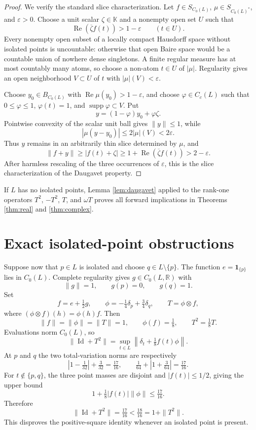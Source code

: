 \documentclass[11pt]{article}
\theoremstyle{remark}
\newcommand{\K}{\mathbb K}
\newcommand{\Id}{\operatorname{Id}}
\begin{document}
\begin{proof}
We verify the standard slice characterization.  Let $f\in S_{C_0(L)}$,
$\mu\in S_{C_0(L)^*}$, and $\varepsilon>0$.  Choose a unit scalar
$\zeta\in\K$ and a nonempty open set $U$ such that
\[
 \operatorname{Re}(\overline\zeta f(t))>1-\varepsilon
 \qquad(t\in U).
\]
Every nonempty open subset of a locally compact Hausdorff space without
isolated points is uncountable: otherwise that open Baire space would be a
countable union of nowhere dense singletons.  A finite regular measure has at
most countably many atoms, so choose a non-atom $t\in U$ of $|\mu|$.
Regularity gives an open neighborhood $V\subset U$ of $t$ with
$|\mu|(V)<\varepsilon$.

Choose $y_0\in B_{C_0(L)}$ with
$\operatorname{Re}\mu(y_0)>1-\varepsilon$, and choose
$\varphi\in C_c(L)$ such that $0\le\varphi\le1$, $\varphi(t)=1$, and
$\operatorname{supp}\varphi\subset V$.  Put
\[
 y=(1-\varphi)y_0+\varphi\zeta.
\]
Pointwise convexity of the scalar unit ball gives $\|y\|\le1$, while
\[
 |\mu(y-y_0)|\le2|\mu|(V)<2\varepsilon.
\]
Thus $y$ remains in an arbitrarily thin slice determined by $\mu$, and
\[
 \|f+y\|\ge |f(t)+\zeta|
 \ge 1+\operatorname{Re}(\overline\zeta f(t))>2-\varepsilon.
\]
After harmless rescaling of the three occurrences of $\varepsilon$, this is
the slice characterization of the Daugavet property.
\end{proof}

If $L$ has no isolated points, Lemma \ref{lem:daugavet} applied to the
rank-one operators $T^2$, $-T^2$, $T$, and $\omega T$ proves all forward
implications in Theorems \ref{thm:real} and \ref{thm:complex}.

\section{Exact isolated-point obstructions}

Suppose now that $p\in L$ is isolated and choose $q\in L\setminus\{p\}$.
The function $e=\mathbf 1_{\{p\}}$ lies in $C_0(L)$.  Complete regularity
gives $g\in C_0(L,\mathbb R)$ with
\[
 \|g\|=1,\qquad g(p)=0,\qquad g(q)=1.
\]
Set
\begin{equation}\label{eq:witness}
 f=e+\tfrac12g,\qquad
 \phi=-\tfrac14\delta_p+\tfrac34\delta_q,\qquad
 T=\phi\otimes f,
\end{equation}
where $(\phi\otimes f)(h)=\phi(h)f$.  Then
\[
 \|f\|=\|\phi\|=\|T\|=1,
 \qquad \phi(f)=\tfrac18,
 \qquad T^2=\tfrac18T.
\]
Evaluations norm $C_0(L)$, so
\[
 \|\Id+T^2\|
 =\sup_{t\in L}
 \left\|\delta_t+\tfrac18 f(t)\phi\right\|.
\]
At $p$ and $q$ the two total-variation norms are respectively
\[
 \left|1-\tfrac1{32}\right|+\tfrac3{32}=\tfrac{17}{16},
 \qquad
 \tfrac1{64}+\left|1+\tfrac3{64}\right|=\tfrac{17}{16}.
\]
For $t\notin\{p,q\}$, the three point masses are disjoint and
$|f(t)|\le1/2$, giving the upper bound
\[
 1+\tfrac18|f(t)|\|\phi\|\le\tfrac{17}{16}.
\]
Therefore
\begin{equation}\label{eq:gap}
 \boxed{\quad
 \|\Id+T^2\|=\tfrac{17}{16}
 <\tfrac{18}{16}=1+\|T^2\|.
 \quad}
\end{equation}
This disproves the positive-square identity whenever an isolated point is
present.
\end{document}
